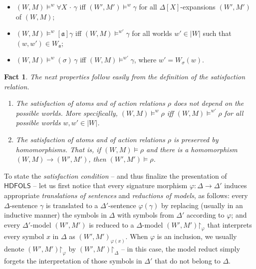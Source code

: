 \documentclass[a4paper,UKenglish,cleveref, autoref]{lipics-v2019}
\newtheorem{fact}[definition]{Fact}
\newcommand{\HDFOLS}{{\mathsf{HDFOLS}}}
\renewcommand{\models}{\vDash}
\newcommand{\red}{\mathord{\upharpoonright}}
\newcommand{\act}{\mathfrak{a}}
\newcommand{\nec}[1]{[#1]}
\newcommand{\forAll}[1]{\forall #1\,{\cdot}\,}
\newcommand{\lnext}[1]{(#1)\,}
\begin{document}
\begin{enumerate}
\begin{itemize}
  \item $(W,M)\models^w \forAll{X}{\gamma}$ iff $(W',M')\models^w \gamma$ for all \(\Delta[X]\)-expansions $(W',M')$ of $(W,M)$;

  \item $(W,M)\models^w \nec{\act} \gamma$ iff $(W,M)\models^{w'}\gamma$ for all worlds $w'\in |W|$ such that $(w,w')\in W_\act$;

  \item $(W,M)\models^w \lnext{\sigma} \gamma$ iff $(W,M)\models^{w'}\gamma$, where \(w' = W_{\sigma}(w)\).

  \end{itemize}

\end{enumerate}

\begin{fact}
  \label{fact:sat-atoms-actrel}
  The next properties follow easily from the definition of the satisfaction relation.
  \begin{enumerate}
    
  \item The satisfaction of atoms and of action relations \(\rho\) does not depend on the possible worlds.
    More specifically, \((W, M) \models^{w} \rho\) iff \((W, M) \models^{w'} \rho\) for all possible worlds \(w, w' \in |W|\).

  \item The satisfaction of atoms and of action relations \(\rho\) is preserved by homomorphisms.
    That is, if \((W, M) \models \rho\) and there is a homomorphism \((W, M) \to (W', M')\), then \((W', M') \models \rho\).
    
  \end{enumerate}
\end{fact}

To state the \emph{satisfaction condition} -- and thus finalize the presentation of \(\HDFOLS\) -- let us first notice that every signature morphism \(\varphi \colon \Delta \to \Delta'\) induces appropriate \emph{translations of sentences} and \emph{reductions of models}, as follows:
every \(\Delta\)-sentence \(\gamma\) is translated to a \(\Delta'\)-sentence \(\varphi(\gamma)\) by replacing (usually in an inductive manner) the symbols in \(\Delta\) with symbols from \(\Delta'\) according to \(\varphi\);
and every \(\Delta'\)-model \((W', M')\) is reduced to a \(\Delta\)-model \((W', M') \red_{\varphi}\) that interprets every symbol \(x\) in \(\Delta\) as \((W', M')_{\varphi(x)}\).
When \(\varphi\) is an inclusion, we usually denote \((W', M') \red_{\varphi}\) by \((W', M') \red_{\Delta}\) -- in this case, the model reduct simply forgets the interpretation of those symbols in \(\Delta'\) that do not belong to \(\Delta\).
\end{document}
